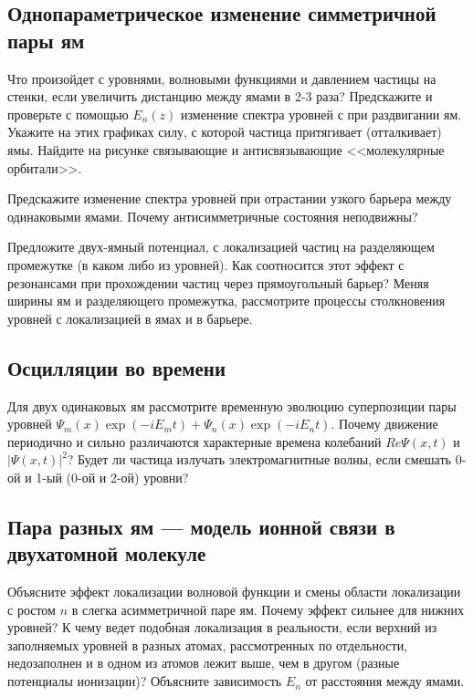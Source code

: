 \documentclass[12pt]{article}
\begin{document}
\hypertarget{double_equal_well_z}
{}\subsection{Однопараметрическое изменение симметричной пары ям}
Что произойдет с уровнями, волновыми функциями и давлением
частицы на стенки, если увеличить дистанцию между ямами в 2-3
раза? Предскажите и проверьте с помощью $E_n(z)$  изменение
спектра уровней с при  раздвигании ям. Укажите на этих графиках
силу, с которой частица притягивает (отталкивает)
ямы. Найдите на рисунке связывающие и антисвязывающие
<<молекулярные орбитали>>.

Предскажите изменение спектра уровней при отрастании узкого
барьера  между  одинаковыми  ямами.  Почему антисимметричные
состояния неподвижны?

Предложите двух-ямный  потенциал, с локализацией  частиц на
разделяющем  промежутке  (в  каком  либо  из  уровней).  Как
соотносится этот эффект с резонансами при прохождении частиц
через  прямоугольный   барьер? Меняя  ширины  ям  и  разделяющего
промежутка, рассмотрите процессы  столкновения уровней  с
локализацией в ямах  и в барьере.

\hypertarget{WP_double_well}{}\subsection{Осцилляции во времени}
Для двух одинаковых ям рассмотрите временную эволюцию
суперпозиции пары уровней $\Psi_m(x)\exp(-iE_mt)+
\Psi_n(x)\exp(-iE_nt)$. Почему  движение периодично и сильно
различаются характерные времена колебаний $Re \Psi(x,t)$  и $|
\Psi (x,t)|^2$? Будет ли частица излучать  электромагнитные
волны, если смешать 0-ой и 1-ый (0-ой и 2-ой) уровни?

\hypertarget{double_inequal_well}{}\subsection{Пара разных ям ---
модель ионной связи в двухатомной молекуле}
Объясните эффект локализации волновой функции %
и смены области локализации с ростом $n$ в слегка асимметричной
паре ям. Почему эффект  сильнее для нижних уровней?
К чему ведет подобная локализация в реальности, если верхний из
заполняемых уровней в разных атомах, рассмотренных по
отдельности, недозаполнен и в одном из атомов лежит выше, чем в
другом (разные потенциалы ионизации)?
Объясните зависимость $E_n$ от расстояния между ямами.
\end{document}
